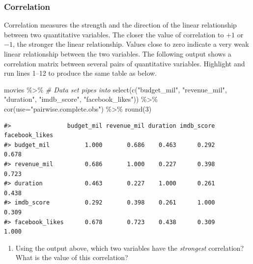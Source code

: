 \documentclass[
]{report}
\newenvironment{Shaded}{\begin{snugshade}}{\end{snugshade}}
\newcommand{\AttributeTok}[1]{\textcolor[rgb]{0.77,0.63,0.00}{#1}}
\newcommand{\CommentTok}[1]{\textcolor[rgb]{0.56,0.35,0.01}{\textit{#1}}}
\newcommand{\DecValTok}[1]{\textcolor[rgb]{0.00,0.00,0.81}{#1}}
\newcommand{\FunctionTok}[1]{\textcolor[rgb]{0.00,0.00,0.00}{#1}}
\newcommand{\NormalTok}[1]{#1}
\newcommand{\SpecialCharTok}[1]{\textcolor[rgb]{0.00,0.00,0.00}{#1}}
\newcommand{\StringTok}[1]{\textcolor[rgb]{0.31,0.60,0.02}{#1}}
\providecommand{\tightlist}{%
  \setlength{\itemsep}{0pt}\setlength{\parskip}{0pt}}
\begin{document}
\hypertarget{correlation}{%
\subsubsection*{Correlation}\label{correlation}}

Correlation measures the strength and the direction of the linear relationship between two quantitative variables. The closer the value of correlation to \(+1\) or \(-1\), the stronger the linear relationship. Values close to zero indicate a very weak linear relationship between the two variables. The following output shows a correlation matrix between several pairs of quantitative variables. Highlight and run lines 1--12 to produce the same table as below.

\begin{Shaded}
\begin{Highlighting}[]
\NormalTok{movies }\SpecialCharTok{\%\textgreater{}\%}  \CommentTok{\# Data set pipes into}
  \FunctionTok{select}\NormalTok{(}\FunctionTok{c}\NormalTok{(}\StringTok{"budget\_mil"}\NormalTok{, }\StringTok{"revenue\_mil"}\NormalTok{, }
           \StringTok{"duration"}\NormalTok{, }\StringTok{"imdb\_score"}\NormalTok{, }
           \StringTok{"facebook\_likes"}\NormalTok{)) }\SpecialCharTok{\%\textgreater{}\%}
  \FunctionTok{cor}\NormalTok{(}\AttributeTok{use=}\StringTok{"pairwise.complete.obs"}\NormalTok{) }\SpecialCharTok{\%\textgreater{}\%}
  \FunctionTok{round}\NormalTok{(}\DecValTok{3}\NormalTok{)}
\end{Highlighting}
\end{Shaded}

\begin{verbatim}
#>                budget_mil revenue_mil duration imdb_score facebook_likes
#> budget_mil          1.000       0.686    0.463      0.292          0.678
#> revenue_mil         0.686       1.000    0.227      0.398          0.723
#> duration            0.463       0.227    1.000      0.261          0.438
#> imdb_score          0.292       0.398    0.261      1.000          0.309
#> facebook_likes      0.678       0.723    0.438      0.309          1.000
\end{verbatim}

\begin{enumerate}
\def\labelenumi{\arabic{enumi}.}
\tightlist
\item
  Using the output above, which two variables have the \emph{strongest} correlation? What is the value of this correlation?
\end{enumerate}
\end{document}
